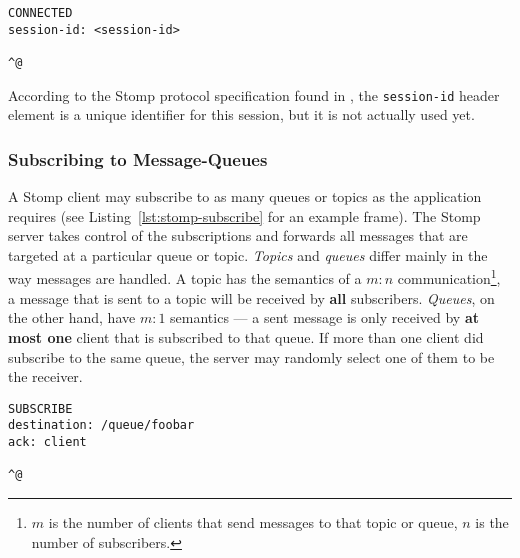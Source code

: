 \medskip
\begin{center}
  \begin{minipage}{.75\textwidth}
    \begin{lstlisting}[captionpos=b,backgroundcolor=\color{listingcolor},frame=lines,numbers=none,stepnumber=5,numberfirstline=false,numberstyle=\tiny,caption={The
        \texttt{CONNECTED} message sent by a Stomp server after a client
        has successfully logged in.},label={lst:stomp-connected}]
CONNECTED
session-id: <session-id>

^@
    \end{lstlisting}
  \end{minipage}
\end{center}

According to  the Stomp protocol specification found  in \cite{stomp}, the
\texttt{session-id}  header  element  is  a  unique  identifier  for  this
session, but it is not actually used yet.

\subsubsection{Subscribing to Message-Queues}

A  Stomp  client  may  subscribe  to  as many  queues  or  topics  as  the
application requires (see Listing~\ref{lst:stomp-subscribe} for an example
frame). The Stomp  server takes control of the  subscriptions and forwards
all   messages   that   are    targeted   at   a   particular   queue   or
topic. \emph{Topics}  and \emph{queues} differ mainly in  the way messages
are    handled.    A    topic    has   the    semantics    of   a    $m:n$
communication\footnote{$m$ is the number  of clients that send messages to
  that topic or  queue, $n$ is the number of  subscribers.}, \ie a message
that   is   sent  to   a   topic   will   be  received   by   \textbf{all}
subscribers. \emph{Queues}, on the other  hand, have $m:1$ semantics --- a
sent  message is  only received  by \textbf{at  most one}  client  that is
subscribed to  that queue.  If more  than one client did  subscribe to the
same queue, the server may randomly select one of them to be the receiver.

\medskip
\begin{center}
  \begin{minipage}{.75\textwidth}
    \begin{lstlisting}[captionpos=b,backgroundcolor=\color{listingcolor},frame=lines,numbers=none,stepnumber=5,numberfirstline=false,numberstyle=\tiny,caption={The
        \texttt{SUBSCRIBE} frame used for queue or topic subscription.},label={lst:stomp-subscribe}]
SUBSCRIBE
destination: /queue/foobar
ack: client

^@
    \end{lstlisting}
  \end{minipage}
\end{center}

